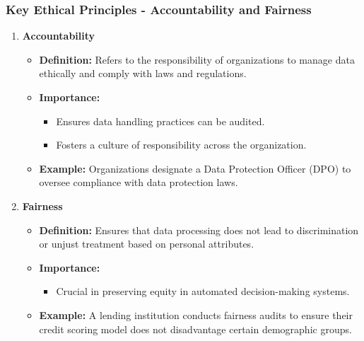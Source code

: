 \documentclass[aspectratio=169]{beamer}
\begin{document}
\begin{frame}[fragile]
  \frametitle{Key Ethical Principles - Accountability and Fairness}
  \begin{enumerate}
    \item \textbf{Accountability}
      \begin{itemize}
        \item \textbf{Definition:} Refers to the responsibility of organizations to manage data ethically and comply with laws and regulations.
        \item \textbf{Importance:} 
          \begin{itemize}
            \item Ensures data handling practices can be audited.
            \item Fosters a culture of responsibility across the organization.
          \end{itemize}
        \item \textbf{Example:} Organizations designate a Data Protection Officer (DPO) to oversee compliance with data protection laws.
      \end{itemize}
      
    \item \textbf{Fairness}
      \begin{itemize}
        \item \textbf{Definition:} Ensures that data processing does not lead to discrimination or unjust treatment based on personal attributes.
        \item \textbf{Importance:} 
          \begin{itemize}
            \item Crucial in preserving equity in automated decision-making systems.
          \end{itemize}
        \item \textbf{Example:} A lending institution conducts fairness audits to ensure their credit scoring model does not disadvantage certain demographic groups.
      \end{itemize}
  \end{enumerate}
\end{frame}
\end{document}
